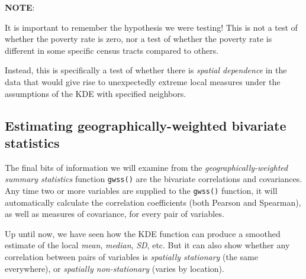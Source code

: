 \documentclass[
]{book}
\newenvironment{Shaded}{\begin{snugshade}}{\end{snugshade}}
\newcommand{\AttributeTok}[1]{\textcolor[rgb]{0.13,0.29,0.53}{#1}}
\newcommand{\FunctionTok}[1]{\textcolor[rgb]{0.13,0.29,0.53}{\textbf{#1}}}
\newcommand{\NormalTok}[1]{#1}
\newcommand{\SpecialCharTok}[1]{\textcolor[rgb]{0.81,0.36,0.00}{\textbf{#1}}}
\newcommand{\StringTok}[1]{\textcolor[rgb]{0.31,0.60,0.02}{#1}}
\newenvironment{rmdcaution}[1]
  {
  \begin{itemize}
  \renewcommand{\labelitemi}{
    \raisebox{-.7\height}[0pt][0pt]{
      {\setkeys{Gin}{width=3em,keepaspectratio}\texttt{[image: images/\#1]}}
    }
  }
  \setlength{\fboxsep}{1em}
  \begin{caution}
  \item
  }
  {
  \end{caution}
  \end{itemize}
  }
\begin{document}
\begin{rmdcaution}{caution}
\textbf{NOTE}:

It is important to remember the hypothesis we were testing! This is not a test of whether the poverty rate is zero, nor a test of whether the poverty rate is different in some specific census tracts compared to others.

Instead, this is specifically a test of whether there is \emph{spatial dependence} in the data that would give rise to unexpectedly extreme local measures under the assumptions of the KDE with specified neighbors.

\end{rmdcaution}

\hypertarget{estimating-geographically-weighted-bivariate-statistics}{%
\subsection{Estimating geographically-weighted bivariate statistics}\label{estimating-geographically-weighted-bivariate-statistics}}

The final bits of information we will examine from the \emph{geographically-weighted summary statistics} function \texttt{gwss()} are the bivariate correlations and covariances. Any time two or more variables are supplied to the \texttt{gwss()} function, it will automatically calculate the correlation coefficients (both Pearson and Spearman), as well as measures of covariance, for every pair of variables.

Up until now, we have seen how the KDE function can produce a smoothed estimate of the local \emph{mean}, \emph{median}, \emph{SD}, etc. But it can also show whether any correlation between pairs of variables is \emph{spatially stationary} (the same everywhere), or \emph{spatially non-stationary} (varies by location).

\begin{Shaded}
\end{Shaded}
\end{document}
